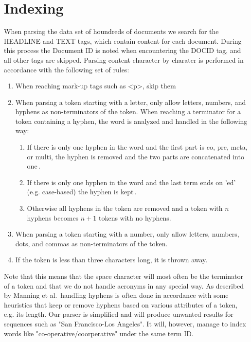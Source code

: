 
\section{Indexing}
\label{sec:indexing}
When parsing the data set of houndreds of documents we search for the HEADLINE and TEXT tags, which contain content for each document. During this process the Document ID is noted when encountering the DOCID tag, and all other tags are skipped. Parsing content character by charater is performed in accordance with the following set of rules:

\begin{enumerate}
	\item When reaching mark-up tags such as <p>, skip them
	\item When parsing a token starting with a letter, only allow letters, numbers, and hyphens as non-terminators of the token. When reaching a terminator for a token containing a hyphen, the word is analyzed and handled in the following way:
	\begin{enumerate}
		\item If there is only one hyphen in the word and the first part is co, pre, meta, or multi, the hyphen is removed and the two parts are concatenated into one\,\cite{ibm13}.
		\item If there is only one hyphen in the word and the last term ends on 'ed' (e.g. case-based) the hyphen is kept\,\cite{ibm13}.
		\item Otherwise all hyphens in the token are removed and a token with $n$ hyphens becomes $n+1$ tokens with no hyphens.
	\end{enumerate}
	\item When parsing a token starting with a number, only allow letters, numbers, dots, and commas as non-terminators of the token.
	\item If the token is less than three characters long, it is thrown away.
\end{enumerate}

Note that this means that the space character will most often be the terminator of a token and that we do not handle acronyms in any special way. As described by Manning et al.\,\cite[p. 24]{manning2008introduction} handling hyphens is often done in accordance with some heuristics that keep or remove hyphens based on various attributes of a token, e.g. its length. Our parser is simplified and will produce unwanted results for sequences such as "San Francisco-Los Angeles". It will, however, manage to index words like "co-operative/coorperative" under the same term ID.

